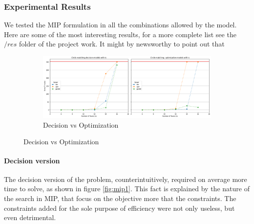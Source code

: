 \subsubsection{Experimental Results}
We tested the MIP formulation in all the combinations allowed by the model. Here are some of the most interesting results, for a more complete list see the $/res$ folder of the project work.
It might by newsworthy to point out that 

\begin{figure}[H]
    \label{fig:mip1}
    \centering
    \begin{subfigure}{\linewidth}
        \centering
        \includegraphics[width=\linewidth]{imgs/plot1.png}
        \caption{Decision vs Optimization}
    \end{subfigure}
\end{figure}

\paragraph{Decision version}
The decision version of the problem, counterintuitively, required on average more time to solve, as shown in figure \ref{fig:mip1}. This fact is explained by the nature of the search in MIP, that focus on the objective more that the constraints.
The constraints added for the sole purpose of efficiency were not only useless, but even detrimental.

